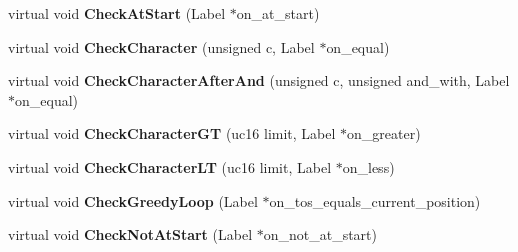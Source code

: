 \begin{DoxyCompactItemize}
\item 
\hypertarget{classv8_1_1internal_1_1_reg_exp_macro_assembler_tracer_adb9ec7a6cd7a6584373bc6cd6818fba2}{}virtual void {\bfseries Check\+At\+Start} (Label $\ast$on\+\_\+at\+\_\+start)\label{classv8_1_1internal_1_1_reg_exp_macro_assembler_tracer_adb9ec7a6cd7a6584373bc6cd6818fba2}

\item 
\hypertarget{classv8_1_1internal_1_1_reg_exp_macro_assembler_tracer_a8a4e4a8666cb0b10028b63faa0faaeeb}{}virtual void {\bfseries Check\+Character} (unsigned c, Label $\ast$on\+\_\+equal)\label{classv8_1_1internal_1_1_reg_exp_macro_assembler_tracer_a8a4e4a8666cb0b10028b63faa0faaeeb}

\item 
\hypertarget{classv8_1_1internal_1_1_reg_exp_macro_assembler_tracer_a04cc89b123da0c49cb9d95f3bbd5f289}{}virtual void {\bfseries Check\+Character\+After\+And} (unsigned c, unsigned and\+\_\+with, Label $\ast$on\+\_\+equal)\label{classv8_1_1internal_1_1_reg_exp_macro_assembler_tracer_a04cc89b123da0c49cb9d95f3bbd5f289}

\item 
\hypertarget{classv8_1_1internal_1_1_reg_exp_macro_assembler_tracer_a8a8e43fad9406f31c8e448488052cb67}{}virtual void {\bfseries Check\+Character\+G\+T} (uc16 limit, Label $\ast$on\+\_\+greater)\label{classv8_1_1internal_1_1_reg_exp_macro_assembler_tracer_a8a8e43fad9406f31c8e448488052cb67}

\item 
\hypertarget{classv8_1_1internal_1_1_reg_exp_macro_assembler_tracer_a620a639bfd9bf374cfe220b7212b1ed1}{}virtual void {\bfseries Check\+Character\+L\+T} (uc16 limit, Label $\ast$on\+\_\+less)\label{classv8_1_1internal_1_1_reg_exp_macro_assembler_tracer_a620a639bfd9bf374cfe220b7212b1ed1}

\item 
\hypertarget{classv8_1_1internal_1_1_reg_exp_macro_assembler_tracer_ac1ec31d01d10004d512681e28bee4e55}{}virtual void {\bfseries Check\+Greedy\+Loop} (Label $\ast$on\+\_\+tos\+\_\+equals\+\_\+current\+\_\+position)\label{classv8_1_1internal_1_1_reg_exp_macro_assembler_tracer_ac1ec31d01d10004d512681e28bee4e55}

\item 
\hypertarget{classv8_1_1internal_1_1_reg_exp_macro_assembler_tracer_aebba3b0389eec6e2d39df80982172198}{}virtual void {\bfseries Check\+Not\+At\+Start} (Label $\ast$on\+\_\+not\+\_\+at\+\_\+start)\label{classv8_1_1internal_1_1_reg_exp_macro_assembler_tracer_aebba3b0389eec6e2d39df80982172198}


\end{DoxyCompactItemize}
